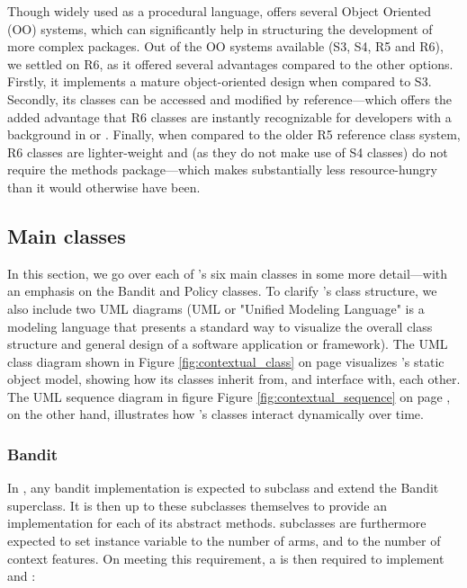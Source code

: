 \documentclass{jss}\usepackage[]{graphicx}\usepackage[]{color}
\begin{document}
Though widely used as a procedural language,  offers several Object Oriented (OO) systems, which can significantly help in structuring the development of more complex packages. Out of the OO systems available (S3, S4, R5 and R6), we settled on R6, as it offered several advantages compared to the other options. Firstly, it implements a mature object-oriented design when compared to S3. Secondly, its classes can be accessed and modified by reference---which offers the added advantage that R6 classes are instantly recognizable for developers with a background in  or . Finally, when compared to the older R5 reference class system, R6 classes are lighter-weight and (as they do not make use of S4 classes) do not require the methods package---which makes  substantially less resource-hungry than it would otherwise have been.

\subsection{Main classes}

In this section, we go over each of 's six main classes in some more detail---with an emphasis on the Bandit and Policy classes. To clarify 's class structure, we also include two UML diagrams (UML or "Unified Modeling Language" is a modeling language that presents a standard way to visualize the overall class structure and general design of a software application or framework). The UML class diagram shown in Figure \ref{fig:contextual_class} on page \pageref{fig:contextual_class} visualizes 's static object model, showing how its classes inherit from, and interface with, each other. The UML sequence diagram in figure Figure \ref{fig:contextual_sequence} on page \pageref{fig:contextual_sequence}, on the other hand, illustrates how 's classes interact dynamically over time.

\subsubsection{Bandit}

In , any bandit implementation is expected to subclass and extend the Bandit superclass. It is then up to these subclasses themselves to provide an implementation for each of its abstract methods. subclasses are furthermore expected to set instance variable  to the number of arms, and  to the number of context features. On meeting this requirement, a  is then required to implement  and :
\end{document}

